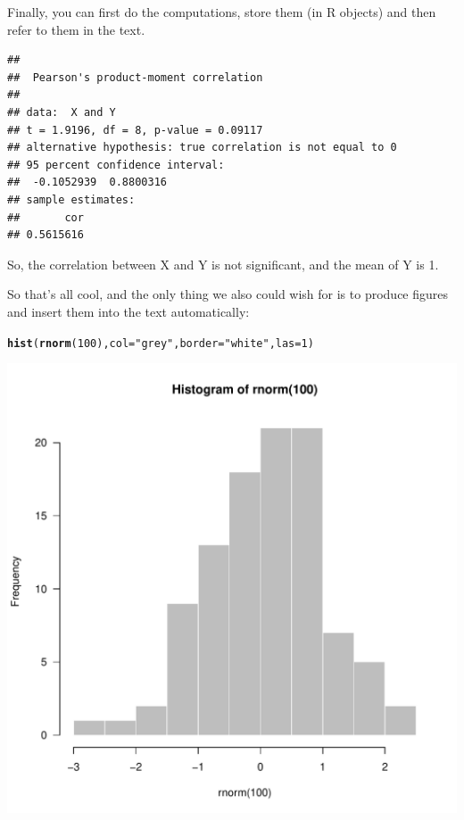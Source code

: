 \documentclass[11pt, a4paper]{article}\usepackage[]{graphicx}\usepackage[]{color}
\makeatletter
\def\maxwidth{ %
  \ifdim\Gin@nat@width>\linewidth
    \linewidth
  \else
    \Gin@nat@width
  \fi
}
\newcommand{\hlnum}[1]{\textcolor[rgb]{0.686,0.059,0.569}{#1}}%
\newcommand{\hlstr}[1]{\textcolor[rgb]{0.192,0.494,0.8}{#1}}%
\newcommand{\hlstd}[1]{\textcolor[rgb]{0.345,0.345,0.345}{#1}}%
\newcommand{\hlkwc}[1]{\textcolor[rgb]{0.333,0.667,0.333}{#1}}%
\newcommand{\hlkwd}[1]{\textcolor[rgb]{0.737,0.353,0.396}{\textbf{#1}}}%
\newenvironment{kframe}{%
 \def\at@end@of@kframe{}%
 \ifinner\ifhmode%
  \def\at@end@of@kframe{\end{minipage}}%
  \begin{minipage}{\columnwidth}%
 \fi\fi%
 \def\FrameCommand##1{\hskip\@totalleftmargin \hskip-\fboxsep
 \colorbox{shadecolor}{##1}\hskip-\fboxsep
     \hskip-\linewidth \hskip-\@totalleftmargin \hskip\columnwidth}%
 \MakeFramed {\advance\hsize-\width
   \@totalleftmargin\z@ \linewidth\hsize
   \@setminipage}}%
 {\par\unskip\endMakeFramed%
 \at@end@of@kframe}
\newenvironment{knitrout}{}{} %
\makeatother
\begin{document}
Finally, you can first do the computations, store them (in R objects) and then refer to them in the text.

\begin{knitrout}
\color{fgcolor}\begin{kframe}
\begin{verbatim}
## 
## 	Pearson's product-moment correlation
## 
## data:  X and Y
## t = 1.9196, df = 8, p-value = 0.09117
## alternative hypothesis: true correlation is not equal to 0
## 95 percent confidence interval:
##  -0.1052939  0.8800316
## sample estimates:
##       cor 
## 0.5615616
\end{verbatim}
\end{kframe}
\end{knitrout}
So, the correlation between X and Y is    not significant, and the mean of Y is 1.

\bigskip

\noindent So that's all cool, and the only thing we also could wish for is to produce figures and insert them into the text automatically:

\begin{knitrout}
\color{fgcolor}\begin{kframe}
\begin{alltt}
\hlkwd{hist}\hlstd{(}\hlkwd{rnorm}\hlstd{(}\hlnum{100}\hlstd{),} \hlkwc{col}\hlstd{=}\hlstr{"grey"}\hlstd{,} \hlkwc{border}\hlstd{=}\hlstr{"white"}\hlstd{,} \hlkwc{las}\hlstd{=}\hlnum{1}\hlstd{)}
\end{alltt}
\end{kframe}

{\centering \includegraphics[width=\maxwidth]{unnamed-chunk-6-1} 

}



\end{knitrout}
\end{document}
